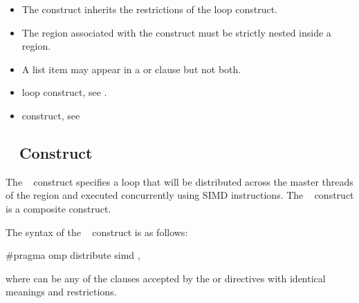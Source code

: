 {{{{\begin{itemize}
\item The  construct inherits the restrictions of the loop construct.

\item The region associated with the  construct must be
strictly nested inside a  region.

\item A list item may appear in a  or  clause but not both.
\end{itemize}

\crossreferences
\begin{itemize}
\item loop construct, see 
.

\item {} construct, see 
\end{itemize}










\subsection{~ Construct}
\label{subsec:distribute simd Construct}
\summary
The ~ construct specifies a loop that will be distributed across the 
master threads of the  region and executed concurrently using SIMD instructions. The ~ construct is a composite construct.

\syntax
The syntax of the ~ construct is as follows:

\ccppspecificstart
\begin{boxedcode}
\#pragma omp distribute simd \plc{[clause[ [},\plc{] clause] ... ] newline}
\end{boxedcode}

where  can be any of the clauses accepted by the  or  
directives with identical meanings and restrictions.
\ccppspecificend

}}}}
